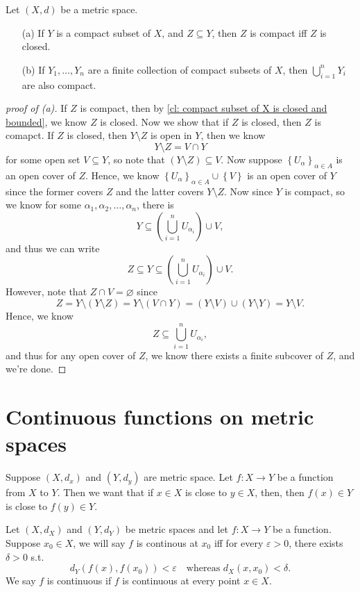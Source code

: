 \begin{theorem}
    Let \((X, d)\) be a metric space. 
    \begin{itemize}
        \item [(a)] If \(Y\) is a compact subset of \(X\), and \(Z \subseteq Y\), then \(Z\) is compact iff \(Z\) is closed.      
        \item [(b)] If \(Y_1, \dots , Y_n\) are a finite collection of compact subsets of \(X\), then \(\bigcup_{i=1}^{n} Y_i \) are also compact.   
    \end{itemize} 
\end{theorem}
\begin{proof}[proof of (a)]
    If \(Z\) is compact, then by \autoref{cl: compact subset of X is closed and bounded}, we know \(Z\) is closed. Now we show that if \(Z\) is closed, then \(Z\) is comapct. If \(Z\) is closed, then \(Y \setminus Z\) is open in \(Y\), then we know 
    \[
        Y \setminus Z = V \cap Y
    \] for some open set \(V \subseteq Y\), so note that \((Y \setminus Z) \subseteq V\). Now suppose \(\left\{ U_\alpha  \right\}_{\alpha \in A} \) is an open cover of \(Z\). Hence, we know \(\left\{ U_\alpha  \right\}_{\alpha \in A} \cup \left\{ V \right\}  \) is an open cover of \(Y\) since the former covers \(Z\) and the latter covers \(Y \setminus Z\). Now since \(Y\) is compact, so we know for some \(\alpha _1, \alpha _2, \dots , \alpha _n\), there is 
    \[
        Y \subseteq \left( \bigcup_{i=1}^{n} U_{\alpha _i} \right) \cup V, 
    \] and thus we can write
    \[
        Z \subseteq Y \subseteq \left( \bigcup_{i=1}^{n} U_{\alpha _i}  \right) \cup V. 
    \]  
    However, note that \(Z \cap V = \varnothing \) since
    \[
        Z = Y \setminus (Y \setminus Z) = Y \setminus (V \cap Y) = (Y \setminus V) \cup (Y \setminus Y) = Y \setminus V.
    \]
    Hence, we know 
    \[
        Z \subseteq \bigcup_{i=1}^{n} U_{\alpha _i}, 
    \] and thus for any open cover of \(Z\), we know there exists a finite subcover of \(Z\), and we're done.
\end{proof}
\chapter{Continuous functions on metric spaces}
Suppose \((X, d_x)\) and \((Y, d_y)\) are metric space. Let \(f: X \to Y\) be a function from \(X\) to \(Y\). Then we want that if \(x \in X\) is close to \(y \in X\), then, then \(f(x)\in Y\) is close to \(f(y) \in Y\). 

\begin{definition} \label{def: continuous}
    Let \((X, d_X)\) and \((Y, d_Y)\) be metric spaces and let \(f: X \to Y\) be a function. Suppose \(x_0 \in X\), we will say \(f\) is continous at \(x_0\) iff for every \(\varepsilon > 0\), there exists \(\delta > 0\) s.t. 
    \[
        d_Y(f(x), f(x_0)) < \varepsilon \quad \text{whereas } d_X(x, x_0) < \delta.
    \] We say \(f\) is continuous if \(f\) is continuous at every point \(x \in X\).     
\end{definition}


